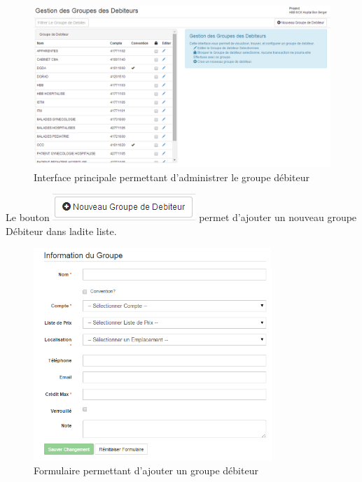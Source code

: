 \documentclass[12pt,a4paper]{report}
\begin{document}
\begin{figure}[h]
\begin{center}
\includegraphics[width=14cm]{pic/AdminGroupDebit.png}
\end{center}
\caption{Interface principale permettant d'administrer le groupe débiteur}
\label{Interface principale permettant d'administrer le groupe débiteur}
\end{figure}

Le bouton \includegraphics[scale=0.7]{pic/NewGroupDebit.png} permet d'ajouter un nouveau groupe Débiteur dans ladite liste.
\newpage
\begin{figure}[h]
\begin{center}
\includegraphics[width=9cm]{pic/FormAddGroupDebiteur.png}
\end{center}
\caption{Formulaire permettant d'ajouter un groupe débiteur}
\label{Formulaire permettant d'ajouter un groupe débiteur}
\end{figure}
\end{document}
